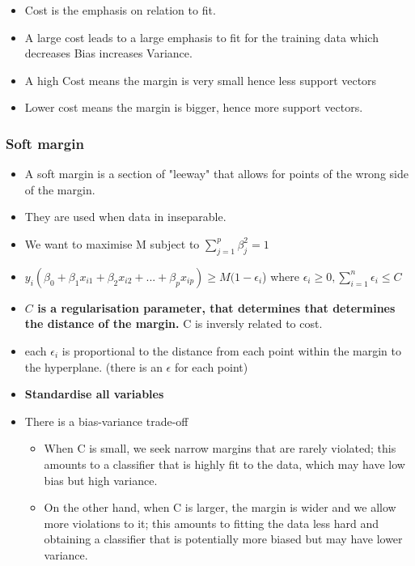 \documentclass{article}
\begin{document}
\begin{itemize}
    \item Cost is the emphasis on relation to fit.
    \item A large cost leads to a large emphasis to fit for the training data which decreases Bias increases Variance.
    \item A high Cost means the margin is very small hence less support vectors
    \item Lower cost means the margin is bigger, hence more support vectors.
~~\end{itemize}

\subsubsection{Soft margin}

\begin{itemize}
    \item A soft margin is a section of "leeway" that allows for points of the wrong side of the margin.
    \item They are used when data in inseparable.
    \item We want to maximise M subject to $\sum_{j=1}^p \beta_j^2 = 1$
    \item $y_i (\beta_0 + \beta_1 x_{i1} + \beta_2 x_{i2} + ... + \beta_p x_{ip}) \geq M(1 - \epsilon_i$) where $\epsilon_i \geq 0, \sum_{i=1}^n \epsilon_i \leq C$
    \item \textbf{$C$ is a regularisation parameter, that determines that determines the distance of the margin.} C is inversly related to cost.
    \item each $\epsilon_i$ is proportional to the distance from each point within the margin to the hyperplane. (there is an $\epsilon$ for each point)
    \item \textbf{Standardise all variables}
    \item There is a bias-variance trade-off
    \begin{itemize}
        \item When C is small, we seek narrow margins that are rarely violated; this amounts to a classifier that is highly fit to the data, which may have low bias but high variance.
        \item On the other hand, when C is larger, the margin is wider and we allow more violations to it; this amounts to fitting the data less hard and obtaining a classifier that is potentially more biased but may have lower variance.
    \end{itemize}
\end{itemize}
\end{document}

